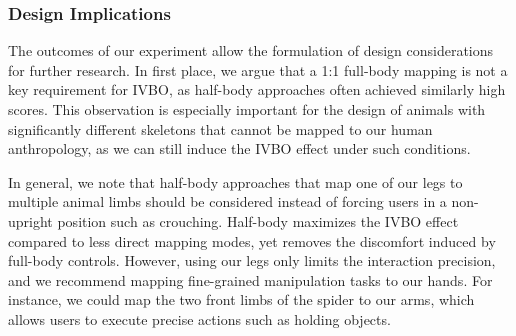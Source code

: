\documentclass[conference]{IEEEtran}
\begin{document}

%
%
%
%

\subsubsection{Design Implications} The outcomes of our experiment allow the formulation of design considerations for further research. In first place, we argue that a 1:1 full-body mapping is not a key requirement for IVBO, as half-body approaches often achieved similarly high scores. This observation is especially important for the design of animals with significantly different skeletons that cannot be mapped to our human anthropology, as we can still induce the IVBO effect under such conditions. 

In general, we note that half-body approaches that map one of our legs to multiple animal limbs should be considered instead of forcing users in a non-upright position such as crouching. Half-body maximizes the IVBO effect compared to less direct mapping modes, yet removes the discomfort induced by full-body controls. However, using our legs only limits the interaction precision, and we recommend mapping fine-grained manipulation tasks to our hands. For instance, we could map the two front limbs of the spider to our arms, which allows users to execute precise actions such as holding objects.
\end{document}
